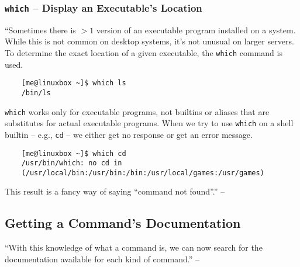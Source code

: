 \documentclass[oneside]{book}
\numberwithin{equation}{section}
\begin{document}
\subsubsection{\texttt{which} -- Display an Executable's Location}
``Sometimes there is $> 1$ version of an executable program installed on a system. While this is not common on desktop systems, it's not unusual on larger servers. To determine the exact location of a given executable, the \texttt{which} command is used.
\begin{verbatim}
	[me@linuxbox ~]$ which ls
	/bin/ls
\end{verbatim}
\texttt{which} works only for executable programs, not builtins or aliases that are substitutes for actual executable programs. When we try to use \texttt{which} on a shell builtin -- e.g., \texttt{cd} -- we either get no response or get an error message.
\begin{verbatim}
	[me@linuxbox ~]$ which cd
	/usr/bin/which: no cd in
	(/usr/local/bin:/usr/bin:/bin:/usr/local/games:/usr/games)
\end{verbatim}
This result is a fancy way of saying ``command not found''.'' -- \cite[p. 85]{Shotts2019}

\subsection{Getting a Command's Documentation}
``With this knowledge of what a command is, we can now search for the documentation available for each kind of command.'' -- \cite[p. 85]{Shotts2019}
\end{document}
